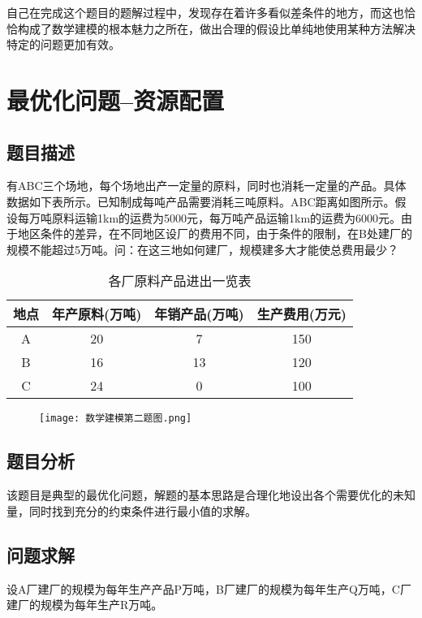 \documentclass[UTF8]{ctexart}
\begin{document}
    自己在完成这个题目的题解过程中，发现存在着许多看似差条件的地方，而这也恰恰构成了数学建模的根本魅力之所在，做出合理的假设比单纯地使用某种方法解决特定的问题更加有效。

    \section{最优化问题--资源配置}
    \subsection{题目描述}
    有ABC三个场地，每个场地出产一定量的原料，同时也消耗一定量的产品。具体数据如下表所示。已知制成每吨产品需要消耗三吨原料。ABC距离如图所示。假设每万吨原料运输1km的运费为5000元，每万吨产品运输1km的运费为6000元。由于地区条件的差异，在不同地区设厂的费用不同，由于条件的限制，在B处建厂的规模不能超过5万吨。问：在这三地如何建厂，规模建多大才能使总费用最少？

    \begin{table}
      \centering
      \begin{tabular}{|c|c|c|c|}
        \hline
        地点 & 年产原料(万吨) & 年销产品(万吨) & 生产费用(万元) \\
        \hline
        A & 20 & 7 & 150 \\
        \hline
        B & 16 & 13 & 120 \\
        \hline
        C & 24 & 0 & 100 \\
        \hline
      \end{tabular}
      \caption{各厂原料产品进出一览表}\label{各厂原料产品进出一览表}
    \end{table}

    \begin{figure}[!htb]
	\centering
	\texttt{[image: 数学建模第二题图.png]}
	\end{figure}

    \subsection{题目分析}
    该题目是典型的最优化问题，解题的基本思路是合理化地设出各个需要优化的未知量，同时找到充分的约束条件进行最小值的求解。

    \subsection{问题求解}
    设A厂建厂的规模为每年生产产品P万吨，B厂建厂的规模为每年生产Q万吨，C厂建厂的规模为每年生产R万吨。
\end{document}
